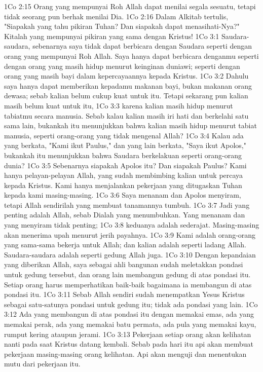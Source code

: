 1Co 2:15  Orang yang mempunyai Roh Allah dapat menilai segala sesuatu, tetapi tidak seorang pun berhak menilai Dia.
1Co 2:16  Dalam Alkitab tertulis, "Siapakah yang tahu pikiran Tuhan? Dan siapakah dapat menasihati-Nya?" Kitalah yang mempunyai pikiran yang sama dengan Kristus!
1Co 3:1  Saudara-saudara, sebenarnya saya tidak dapat berbicara dengan Saudara seperti dengan orang yang mempunyai Roh Allah. Saya hanya dapat berbicara denganmu seperti dengan orang yang masih hidup menurut keinginan duniawi; seperti dengan orang yang masih bayi dalam kepercayaannya kepada Kristus.
1Co 3:2  Dahulu saya hanya dapat memberikan kepadamu makanan bayi, bukan makanan orang dewasa; sebab kalian belum cukup kuat untuk itu. Tetapi sekarang pun kalian masih belum kuat untuk itu,
1Co 3:3  karena kalian masih hidup menurut tabiatmu secara manusia. Sebab kalau kalian masih iri hati dan berkelahi satu sama lain, bukankah itu menunjukkan bahwa kalian masih hidup menurut tabiat manusia, seperti orang-orang yang tidak mengenal Allah?
1Co 3:4  Kalau ada yang berkata, "Kami ikut Paulus," dan yang lain berkata, "Saya ikut Apolos," bukankah itu menunjukkan bahwa Saudara berkelakuan seperti orang-orang dunia?
1Co 3:5  Sebenarnya siapakah Apolos itu? Dan siapakah Paulus? Kami hanya pelayan-pelayan Allah, yang sudah membimbing kalian untuk percaya kepada Kristus. Kami hanya menjalankan pekerjaan yang ditugaskan Tuhan kepada kami masing-masing.
1Co 3:6  Saya menanam dan Apolos menyiram, tetapi Allah sendirilah yang membuat tanamannya tumbuh.
1Co 3:7  Jadi yang penting adalah Allah, sebab Dialah yang menumbuhkan. Yang menanam dan yang menyiram tidak penting;
1Co 3:8  keduanya adalah sederajat. Masing-masing akan menerima upah menurut jerih payahnya.
1Co 3:9  Kami adalah orang-orang yang sama-sama bekerja untuk Allah; dan kalian adalah seperti ladang Allah. Saudara-saudara adalah seperti gedung Allah juga.
1Co 3:10  Dengan kepandaian yang diberikan Allah, saya sebagai ahli bangunan sudah meletakkan pondasi untuk gedung tersebut, dan orang lain membangun gedung di atas pondasi itu. Setiap orang harus memperhatikan baik-baik bagaimana ia membangun di atas pondasi itu.
1Co 3:11  Sebab Allah sendiri sudah menempatkan Yesus Kristus sebagai satu-satunya pondasi untuk gedung itu; tidak ada pondasi yang lain.
1Co 3:12  Ada yang membangun di atas pondasi itu dengan memakai emas, ada yang memakai perak, ada yang memakai batu permata, ada pula yang memakai kayu, rumput kering ataupun jerami.
1Co 3:13  Pekerjaan setiap orang akan kelihatan nanti pada saat Kristus datang kembali. Sebab pada hari itu api akan membuat pekerjaan masing-masing orang kelihatan. Api akan menguji dan menentukan mutu dari pekerjaan itu.
